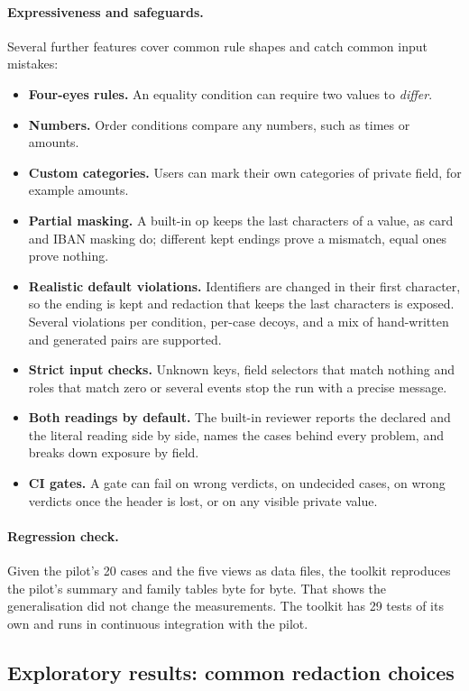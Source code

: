 \documentclass[11pt]{article}
\begin{document}
\paragraph{Expressiveness and safeguards.} Several further features cover common rule shapes and catch common input mistakes:
\begin{itemize}
  \item \textbf{Four-eyes rules.} An equality condition can require two values to \emph{differ}.
  \item \textbf{Numbers.} Order conditions compare any numbers, such as times or amounts.
  \item \textbf{Custom categories.} Users can mark their own categories of private field, for example amounts.
  \item \textbf{Partial masking.} A built-in op keeps the last characters of a value, as card and IBAN masking do; different kept endings prove a mismatch, equal ones prove nothing.
  \item \textbf{Realistic default violations.} Identifiers are changed in their first character, so the ending is kept and redaction that keeps the last characters is exposed. Several violations per condition, per-case decoys, and a mix of hand-written and generated pairs are supported.
  \item \textbf{Strict input checks.} Unknown keys, field selectors that match nothing and roles that match zero or several events stop the run with a precise message.
  \item \textbf{Both readings by default.} The built-in reviewer reports the declared and the literal reading side by side, names the cases behind every problem, and breaks down exposure by field.
  \item \textbf{CI gates.} A gate can fail on wrong verdicts, on undecided cases, on wrong verdicts once the header is lost, or on any visible private value.
\end{itemize}

\paragraph{Regression check.} Given the pilot's 20 cases and the five views as data files, the toolkit reproduces the pilot's summary and family tables byte for byte. That shows the generalisation did not change the measurements. The toolkit has 29 tests of its own and runs in continuous integration with the pilot.

\subsection*{Exploratory results: common redaction choices}
\end{document}
